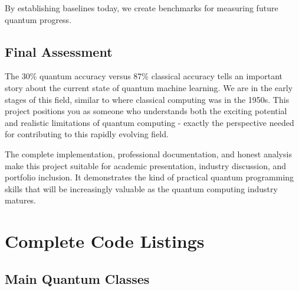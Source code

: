 \documentclass[11pt,a4paper]{article}
\begin{document}
By establishing baselines today, we create benchmarks for measuring future quantum progress.

\subsection{Final Assessment}

The 30\% quantum accuracy versus 87\% classical accuracy tells an important story about the current state of quantum machine learning. We are in the early stages of this field, similar to where classical computing was in the 1950s. This project positions you as someone who understands both the exciting potential and realistic limitations of quantum computing - exactly the perspective needed for contributing to this rapidly evolving field.

The complete implementation, professional documentation, and honest analysis make this project suitable for academic presentation, industry discussion, and portfolio inclusion. It demonstrates the kind of practical quantum programming skills that will be increasingly valuable as the quantum computing industry matures.

\appendix

\section{Complete Code Listings}

\subsection{Main Quantum Classes}
\end{document}
